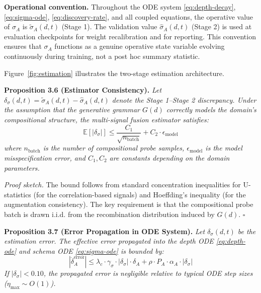 \textbf{Operational convention.} Throughout the ODE system
\eqref{eq:depth-decay}, \eqref{eq:sigma-ode},
\eqref{eq:discovery-rate}, and all coupled equations, the operative
value of $\sigma_A$ is $\tilde{\sigma}_A(d,t)$ (Stage 1). The validation
value $\hat{\sigma}_A(d,t)$ (Stage 2) is used at evaluation checkpoints
for weight recalibration and for reporting. This convention ensures that
$\sigma_A$ functions as a genuine operative state variable evolving
continuously during training, not a post hoc summary statistic.



Figure~\ref{fig:estimation} illustrates the two-stage estimation architecture.

\textbf{Proposition 3.6 (Estimator Consistency).} %
\textit{Let $\delta_\sigma(d,t) = \tilde{\sigma}_A(d,t) - \hat{\sigma}_A(d,t)$
denote the Stage 1--Stage 2 discrepancy. Under the assumption that the
generative grammar $G(d)$ correctly models the domain's compositional
structure, the multi-signal fusion estimator satisfies:
\begin{equation}\label{eq:estimator-bound}
\mathbb{E}[|\delta_\sigma|] \leq \frac{C_1}{\sqrt{n_{\text{batch}}}} + C_2 \cdot \epsilon_{\text{model}}
\end{equation}
where $n_{\text{batch}}$ is the number of compositional probe samples,
$\epsilon_{\text{model}}$ is the model misspecification error, and $C_1, C_2$
are constants depending on the domain parameters.}

\textit{Proof sketch.} The bound follows from standard concentration
inequalities for U-statistics (for the correlation-based signals) and
Hoeffding's inequality (for the augmentation consistency). The key
requirement is that the compositional probe batch is drawn i.i.d. from
the recombination distribution induced by $G(d)$. $\square$

\textbf{Proposition 3.7 (Error Propagation in ODE System).} %
\textit{Let $\delta_\sigma(d,t)$ be the estimation error. The effective
error propagated into the depth ODE \eqref{eq:depth-ode} and schema ODE
\eqref{eq:sigma-ode} is bounded by:
\begin{equation}\label{eq:error-propagation}
|\dot{\delta}_A^{\text{error}}| \leq \lambda_c \cdot \gamma_\sigma \cdot |\delta_\sigma| \cdot \delta_A + \rho \cdot P_A \cdot \alpha_A \cdot |\delta_\sigma|
\end{equation}
If $|\delta_\sigma| < 0.10$, the propagated error is negligible relative
to typical ODE step sizes ($\eta_{\max} \sim O(1)$).}



